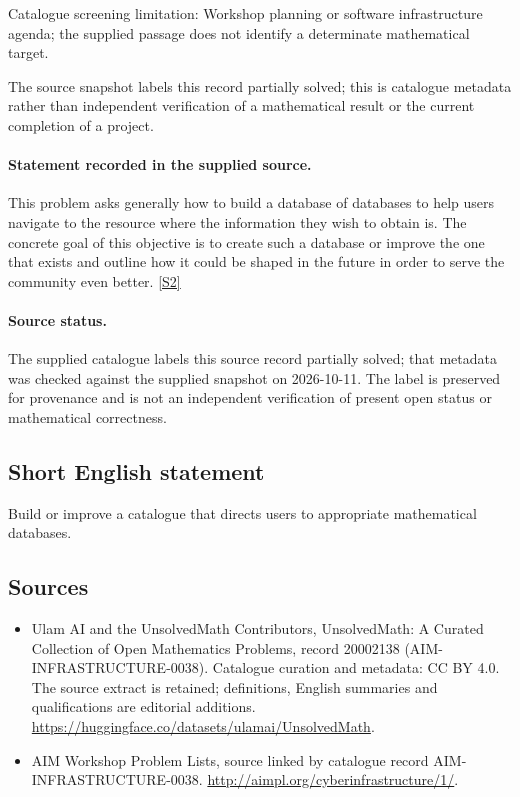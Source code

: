 \documentclass[11pt]{article}
\begin{document}
Catalogue screening limitation: Workshop planning or software infrastructure agenda; the supplied passage does not identify a determinate mathematical target.

The source snapshot labels this record partially solved; this is catalogue metadata rather than independent verification of a mathematical result or the current completion of a project.
\paragraph{Statement recorded in the supplied source.}
This problem asks generally how to build a database of databases to help users navigate to the resource where the information they wish to obtain is.
The concrete goal of this objective is to create such a database or improve the one that exists and outline how it could be shaped in the future in order to serve the community even better. \href{http://aimpl.org/cyberinfrastructure/1/}{[S2]}
\paragraph{Source status.}
The supplied catalogue labels this source record partially solved; that metadata was checked against the supplied snapshot on 2026-10-11. The label is preserved for provenance and is not an independent verification of present open status or mathematical correctness.
\subsection{Short English statement}
Build or improve a catalogue that directs users to appropriate mathematical databases.
\subsection{Sources}
\begin{itemize}
\item[S1] Ulam AI and the UnsolvedMath Contributors, UnsolvedMath: A Curated Collection of Open Mathematics Problems, record 20002138 (AIM-INFRASTRUCTURE-0038). Catalogue curation and metadata: CC BY 4.0. The source extract is retained; definitions, English summaries and qualifications are editorial additions.
\url{https://huggingface.co/datasets/ulamai/UnsolvedMath}.
\item[S2] AIM Workshop Problem Lists, source linked by catalogue record AIM-INFRASTRUCTURE-0038.
\url{http://aimpl.org/cyberinfrastructure/1/}.
\end{itemize}
\end{document}
